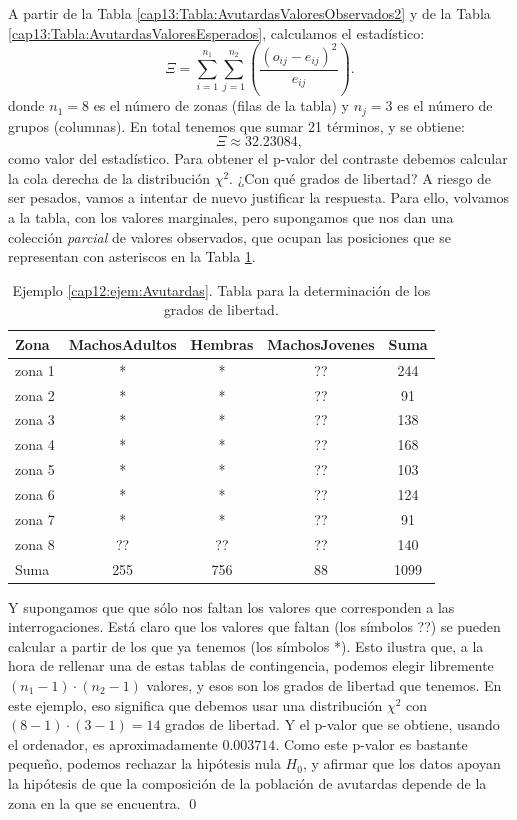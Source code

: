 \begin{Ejemplo}
A partir de la Tabla \ref{cap13:Tabla:AvutardasValoresObservados2} y de la Tabla
\ref{cap13:Tabla:AvutardasValoresEsperados}, calculamos el estadístico:
    \[\Xi=\sum_{i=1}^{n_1}\sum_{j=1}^{n_2}\left(\dfrac{(o_{ij}-e_{ij})^2}{e_{ij}}\right).\]
donde $n_1=8$ es el número de zonas (filas de la tabla) y $n_j=3$ es el número de grupos
(columnas). En total tenemos que sumar 21 términos, y se obtiene:
    \[\Xi\approx 32.23084,\]
como valor del estadístico. Para obtener el p-valor del contraste debemos calcular la cola derecha
de la distribución $\chi^2$. ¿Con qué grados de libertad? A riesgo de ser pesados, vamos a intentar
de nuevo justificar la respuesta. Para ello, volvamos a la tabla, con los valores marginales, pero
supongamos que nos dan una colección {\em parcial} de valores observados, que ocupan las posiciones
que se representan con asteriscos en la Tabla \ref{cap13:Tabla:AvutardasGradosLibertad}.
\begin{table}[htb]
\centering
\begin{tabular}{lccc|c}
  \hline
 Zona & MachosAdultos & Hembras & MachosJovenes & Suma \\
  \hline
    zona 1 & * & * & ?? & 244 \\
    zona 2 & * & * & ?? & 91 \\
    zona 3 & * & * & ?? & 138 \\
    zona 4 & * & * & ?? & 168 \\
    zona 5 & * & * & ?? & 103 \\
    zona 6 & * & * & ?? & 124 \\
    zona 7 & * & * & ?? & 91 \\
    zona 8 & ?? & ?? & ?? & 140 \\
    \hline
    Suma & 255 & 756 & 88 & 1099 \\
   \hline
\end{tabular}
\caption{Ejemplo \ref{cap12:ejem:Avutardas}. Tabla para la determinación de los grados de libertad.}
\label{cap13:Tabla:AvutardasGradosLibertad}
\end{table}

Y supongamos que que sólo nos faltan los valores que corresponden a las interrogaciones. Está claro
que los valores que faltan (los símbolos ??) se pueden calcular a partir de los que ya tenemos (los símbolos *). Esto ilustra que, a la hora de rellenar una de estas tablas de contingencia, podemos elegir libremente
$(n_1-1)\cdot(n_2-1)$ valores, y esos son los grados de libertad que tenemos. En este ejemplo, eso
significa que debemos usar una distribución $\chi^2$ con $(8-1)\cdot(3-1)=14$ grados de libertad. Y
el p-valor que se obtiene, usando el ordenador, es aproximadamente $0.003714$. Como este p-valor
es bastante pequeño, podemos rechazar la hipótesis nula $H_0$, y afirmar que los datos apoyan la
hipótesis de que la composición de la población de avutardas depende de la zona en la que se
encuentra.
\qed
\end{Ejemplo}

